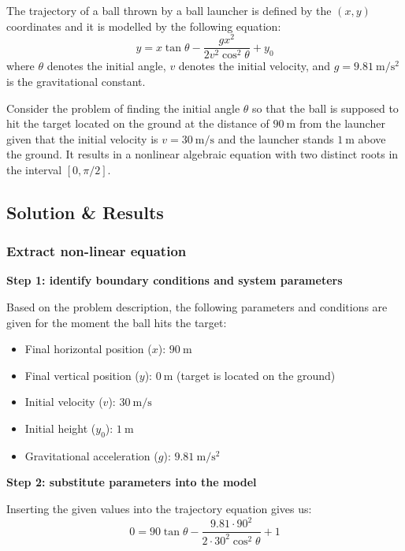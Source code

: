 \documentclass{article}
\begin{document}
The trajectory of a ball thrown by a ball launcher is defined by the $(x, y)$ coordinates and it is modelled by the following equation:
\begin{equation}
    y = x \tan \theta - \frac{g x^2}{2 v^2 \cos^2 \theta} + y_0
\end{equation}
where $\theta$ denotes the initial angle, $v$ denotes the initial velocity, and $g = 9.81 \mathrm{~m/s^2}$ is the gravitational constant.

Consider the problem of finding the initial angle $\theta$ so that the ball is supposed to hit the target located on the ground at the distance of $90 \mathrm{~m}$ from the launcher given that the initial velocity is $v = 30 \mathrm{~m/s}$ and the launcher stands $1 \mathrm{~m}$ above the ground. It results in a nonlinear algebraic equation with two distinct roots in the interval $[0, \pi/2]$.

\subsection{Solution \& Results}
\subsubsection{Extract non-linear equation}

\noindent \textbf{Step 1: identify boundary conditions and system parameters}

Based on the problem description, the following parameters and conditions are given for the moment the ball hits the target:
\begin{itemize}
    \item Final horizontal position ($x$): $90 \mathrm{~m}$
    \item Final vertical position ($y$): $0 \mathrm{~m}$ (target is located on the ground)
    \item Initial velocity ($v$): $30 \mathrm{~m/s}$
    \item Initial height ($y_0$): $1 \mathrm{~m}$
    \item Gravitational acceleration ($g$): $9.81 \mathrm{~m/s^2}$
\end{itemize}

\noindent \textbf{Step 2: substitute parameters into the model}

Inserting the given values into the trajectory equation gives us:
\begin{equation}
    0 = 90 \tan\theta - \frac{9.81 \cdot 90^2}{2 \cdot 30^2 \cos^2\theta} + 1
\end{equation}
\end{document}

